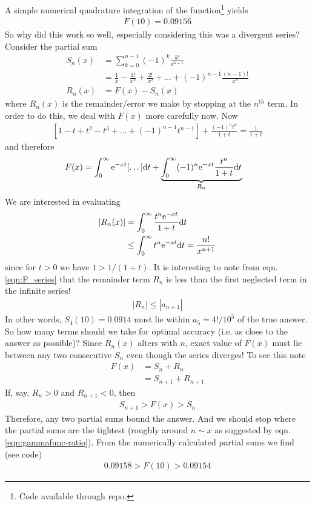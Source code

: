 A simple numerical quadrature integration of the function\footnote{Code available through repo.} yields
\begin{gather*}
	F(10) = 0.09156
\end{gather*}
So why did this work so well, especially considering this was a divergent series? Consider the partial sum
\begin{align*}
	S_n(x) &= \sum_{k=0}^{n-1} (-1)^k \frac{k!}{x^{k+1}} \\
	&= \frac{1}{x} - \frac{1!}{x^2} + \frac{2!}{x^2} + \dots + (-1)^{n-1}\frac{(n-1)!}{x^n} \\
	R_n(x) &= F(x) - S_n(x)
\end{align*}
where $R_n(x)$ is the remainder/error we make by stopping at the $n^{th}$ term. In order to do this, we deal with $F(x)$ more carefully now. Now
\begin{gather*}
	\left[1 - t + t^2 - t^3 + \dots + (-1)^{n-1}t^{n-1}\right] + \frac{(-1)^n t^n}{1+t} = \frac{1}{1+t}
\end{gather*}
and therefore
\begin{align*}
	F(x) &= \int_{0}^{\infty} \mathrm{e}^{-xt} [\dots] \mathrm{d} t + \underbrace{\int_{0}^{\infty} (-1)^n \mathrm{e}^{-xt} \frac{ t^n}{1+t} \mathrm{d} t }_{R_n}
\end{align*}
We are interested in evaluating
\begin{align*}
	|R_n(x)| &= \int_{0}^{\infty} \frac{t^n \mathrm{e}^{-xt}}{1+t} \mathrm{d} t \\
	& \leq  \int_{0}^{\infty} {t^n \mathrm{e}^{-xt}} \mathrm{d} t = \frac{n!}{x^{n+1}}
\end{align*}
since for $t>0$ we have $1> 1/(1+t)$. It is interesting to note from eqn. \ref{eqn:F_series} that the remainder term $R_n$ is less than the first neglected term in the infinite series!
\begin{gather*}
	|R_n| \leq |a_{n+1}|
\end{gather*}
In other words, $S_4(10) = 0.0914$ must lie within $a_5 = 4!/10^5$ of the true answer. So how many terms should we take for optimal accuracy (i.e. as close to the answer as possible)? Since $R_n(x)$ alters with $n$, exact value of $F(x)$ must lie between any two consecutive $S_n$ even though the series diverges! To see this note
\begin{align*}
	F(x) &= S_n + R_n \\
		&= S_{n+1} + R_{n+1}  
\end{align*}
If, say, $R_n > 0$ and $R_{n+1} < 0$, then 
\begin{gather*}
	S_{n+1}>F(x) > S_n
\end{gather*}
Therefore, any two partial sums bound the answer. And we should stop where the partial sums are the tightest (roughly around $n \sim x$ as suggested by eqn. \ref{eqn:gammafunc-ratio}). From the numerically calculated partial sums we find (see code)
\begin{gather*}
0.09158 > F(10) > 0.09154
\end{gather*}
